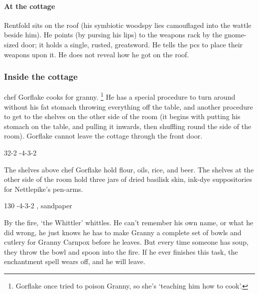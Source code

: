 \documentclass[10pt,twoside]{book}
\begin{document}
\paragraph{At the cottage}
Rentfold sits on the roof (his symbiotic \gls{woodspy} lies camouflaged into the wattle beside him).
He points (by pursing his lips) to the weapons rack by the gnome-sized door; it holds a single, rusted, greatsword.
He tells the \glspl{pc} to place their weapons upon it.
He does not reveal how he got on the roof.

\subsubsection{Inside the cottage}
chef Gorflake cooks for granny.%
\footnote{Gorflake once tried to poison Granny, so she's `teaching him how to cook'.}
He has a special procedure to turn around without his fat stomach throwing everything off the table, and another procedure to get to the shelves on the other side of the room (it begins with putting his stomach on the table, and pulling it inwards, then shuffling round the side of the room).
Gorflake cannot leave the cottage through the front door.

%
  {{3}{2}{-2}}%
  {{-4}{-3}{-2}}%
  {%
  }%
  {}%
  {}%
  {}%

The shelves above chef Gorflake hold flour, oils, rice, and beer.
The shelves at the other side of the room hold three jars of dried \gls{basilisk} skin, ink-dye suppositories for Nettlepike's pen-arms.

%
  {{1}{3}{0}}%
  {{-4}{-3}{-2}}%
  {%
    \Dagger
  }%
  {, \weaponmaster}%
  {sandpaper}%
  {}%

By the fire, `the Whittler' whittles.
He can't remember his own name, or what he did wrong, he just knows he has to make Granny a complete set of bowls and cutlery for Granny Carnpox before he leaves.
But every time someone has soup, they throw the bowl and spoon into the fire.
If he ever finishes this task, the enchantment \gls{spell} wears off, and he will leave.
\end{document}
